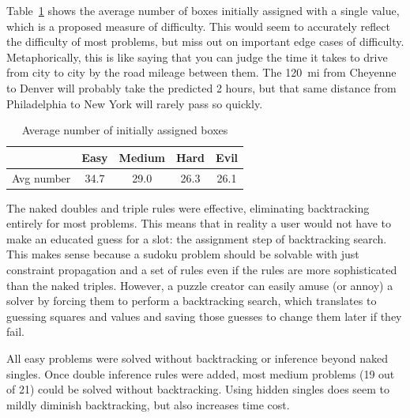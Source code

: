 \documentclass[12pt]{article}
\begin{document}
Table~\ref{tab:boxct} shows the average number of boxes initially assigned with a single value, which is a proposed measure of difficulty.
This would seem to accurately reflect the difficulty of most problems, but miss out on important edge cases of difficulty.
Metaphorically, this is like saying that you can judge the time it takes to drive from city to city by the road mileage between them.
The \SI{120}{mi} from Cheyenne to Denver will probably take the predicted 2 hours, but that same distance from Philadelphia to New York will rarely pass so quickly.

\begin{table}[!ht]
	\centering
	\caption{Average number of initially assigned boxes}
	\label{tab:boxct}
	\begin{tabular}{||c c c c c||} 
		\hline
		& Easy & Medium & Hard & Evil \\ [0.5ex] 
		\hline
		Avg number & 34.7 & 29.0 & 26.3 & 26.1 \\ [1ex] 
		\hline
	\end{tabular}
\end{table}

The naked doubles and triple rules were effective, eliminating backtracking entirely for most problems. 
This means that in reality a user would not have to make an educated guess for a slot: the assignment step of backtracking search. 
This makes sense because a sudoku problem should be solvable with just constraint propagation and a set of rules even if the rules are more sophisticated than the naked triples.
However, a puzzle creator can easily amuse (or annoy) a solver by forcing them to perform a backtracking search, which translates to guessing squares and values and saving those guesses to change them later if they fail.

All easy problems were solved without backtracking or inference beyond naked singles. Once double inference rules were added, most medium problems (19 out of 21) could be solved without backtracking.
Using hidden singles does seem to mildly diminish backtracking, but also increases time cost.
\end{document}
